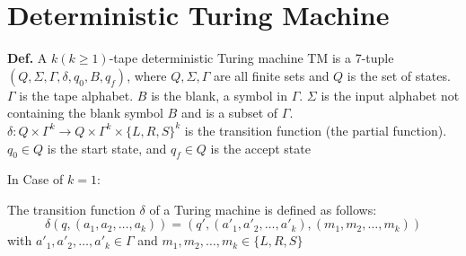\documentclass[12pt,openany]{book}
\theoremstyle{definition}
\begin{document}
	\section{Deterministic Turing Machine}
	
	\textbf{Def.} A \( k (k \geq 1) \)-tape deterministic Turing machine TM is a 7-tuple \( (Q, \Sigma, \Gamma, \delta, q_0, B, q_f) \), where \( Q, \Sigma, \Gamma \) are all finite sets and \( Q \) is the set of states. \( \Gamma \) is the tape alphabet. \( B \) is the blank, a symbol in \( \Gamma \). \( \Sigma \) is the input alphabet not containing the blank symbol \( B \) and is a subset of \( \Gamma \). \( \delta : Q \times \Gamma^k \rightarrow Q \times \Gamma^k \times \{L, R, S\}^k \) is the transition function (the partial function). \( q_0 \in Q \) is the start state, and \( q_f \in Q \) is the accept state
	
	In Case of \( k = 1 \):
	
	\begin{center}
	\end{center}
	
	
	The transition function \( \delta \) of a Turing machine is defined as follows:
	\[
	\delta(q, (a_1, a_2, \ldots, a_k)) = (q', (a'_1, a'_2, \ldots, a'_k), (m_1, m_2, \ldots, m_k))
	\]
	with \( a'_1, a'_2, \ldots, a'_k \in \Gamma \) and \( m_1, m_2, \ldots, m_k \in \{L, R, S\} \)
	
\end{document}
